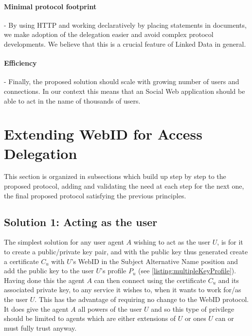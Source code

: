 \documentclass[a4paper]{llncs}
\begin{document}
\paragraph{Minimal protocol footprint}-
By using HTTP and working declaratively by placing statements in documents, we make adoption of the delegation easier and avoid complex protocol developments.
We believe that this is a crucial feature of Linked Data in general.

\paragraph{Efficiency}-
Finally, the proposed solution should scale with growing number of users and connections.
In our context this means that an Social Web application should be able to act in the name of thousands of users.

 

\section{Extending WebID for Access Delegation}\label{sec:spec}

This section is organized in subsections which build up step by step to the proposed protocol, adding and validating the need at each step for the next one, the final proposed protocol satisfying the previous principles. 

\subsection{Solution 1: Acting as the user}

The simplest solution for any user agent $A$ wishing to act as the user $U$, is for it to create a public/private key pair,  and with the public key thus generated create a certificate $C_u$ with $U$'s WebID in the Subject Alternative Name position and add the public key to the user $U$'s profile $P_u$ (see \autoref{listing:multipleKeyProfile}).
Having done this the agent $A$ can then connect using the certificate $C_u$ and its associated private key, to any service it wishes to, when it wants to work for/as the user $U$.
This has the advantage of requiring no change to the WebID protocol.
It does give the agent $A$ all powers of the user $U$ and so this type of privilege should be limited to agents which are either extensions of $U$ or ones $U$ can or must fully trust anyway.
\end{document}
